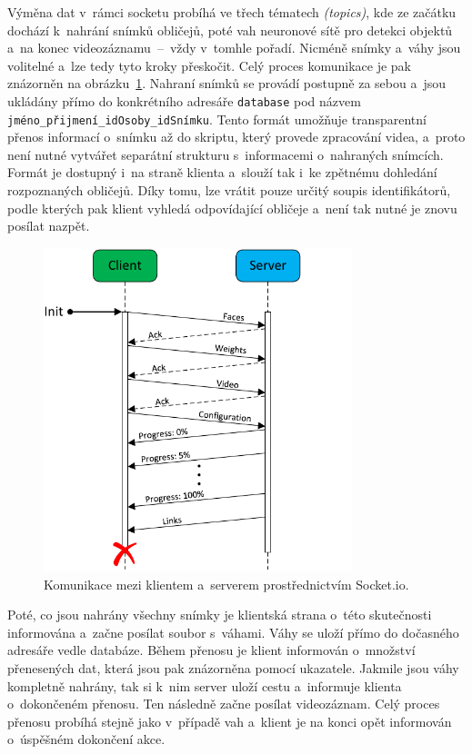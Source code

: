 Výměna dat v~rámci socketu probíhá ve třech tématech \emph{(topics)}, kde ze začátku dochází k~nahrání snímků obličejů, poté vah neuronové sítě pro detekci objektů a~na konec videozáznamu~--~vždy v~tomhle pořadí. Nicméně snímky a~váhy jsou volitelné a~lze tedy tyto kroky přeskočit. Celý proces komunikace je pak znázorněn na obrázku~\ref{img:socketCom}. Nahraní snímků se provádí postupně za sebou a~jsou ukládány přímo do konkrétního adresáře \texttt{database} pod názvem \texttt{jméno\_přijmení\_idOsoby\_idSnímku}. Tento formát umožňuje transparentní přenos informací o~snímku až do skriptu, který provede zpracování videa, a~proto není nutné vytvářet separátní strukturu s~informacemi o~nahraných snímcích. Formát je dostupný i~na straně klienta a~slouží tak i~ke zpětnému dohledání rozpoznaných obličejů. Díky tomu, lze vrátit pouze určitý soupis identifikátorů, podle kterých pak klient vyhledá odpovídající obličeje a~není tak nutné je znovu posílat nazpět.

\begin{figure}[hbt]
	\centering
	\setlength{\fboxsep}{0pt}
	\includegraphics[width=0.8\textwidth]{obrazky-figures/socket_com.pdf}
	\caption{Komunikace mezi klientem a~serverem prostřednictvím Socket.io.}
	\label{img:socketCom}
\end{figure}

Poté, co jsou nahrány všechny snímky je klientská strana o~této skutečnosti informována a~začne posílat soubor s~váhami. Váhy se uloží přímo do dočasného adresáře vedle databáze. Během přenosu je klient informován o~množství přenesených dat, která jsou pak znázorněna pomocí ukazatele. Jakmile jsou váhy kompletně nahrány, tak si k~nim server uloží cestu a~informuje klienta o~dokončeném přenosu. Ten následně začne posílat videozáznam. Celý proces přenosu probíhá stejně jako v~případě vah a~klient je na konci opět informován o~úspěšném dokončení akce.

